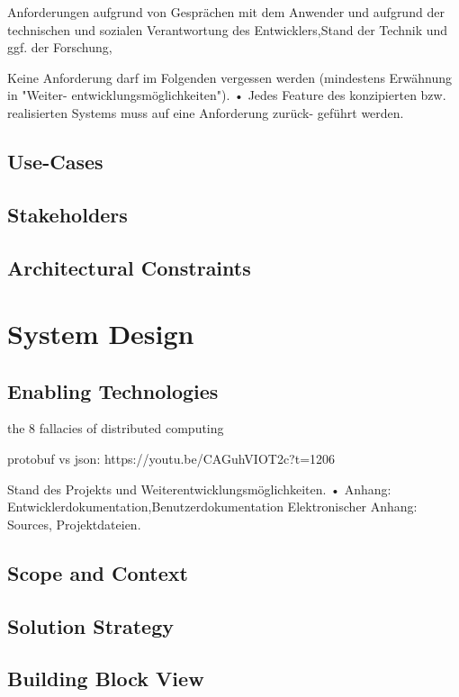 Anforderungen aufgrund von Gesprächen mit dem Anwender und aufgrund der technischen
und sozialen Verantwortung des Entwicklers,Stand der Technik und ggf. der Forschung,

Keine Anforderung darf im Folgenden vergessen werden (mindestens Erwähnung in "Weiter- entwicklungsmöglichkeiten").
• Jedes Feature des konzipierten bzw. realisierten Systems muss auf eine Anforderung zurück- geführt werden.

\subsection{Use-Cases}

\subsection{Stakeholders}

\subsection{Architectural Constraints}

\section{System Design}

\subsection{Enabling Technologies}

the 8 fallacies of distributed computing

protobuf vs json: https://youtu.be/CAGuhVIOT2c?t=1206

Stand des Projekts und Weiterentwicklungsmöglichkeiten.
• Anhang: Entwicklerdokumentation,Benutzerdokumentation
Elektronischer Anhang: Sources, Projektdateien.

\subsection{Scope and Context}

\subsection{Solution Strategy}

\subsection{Building Block View}

